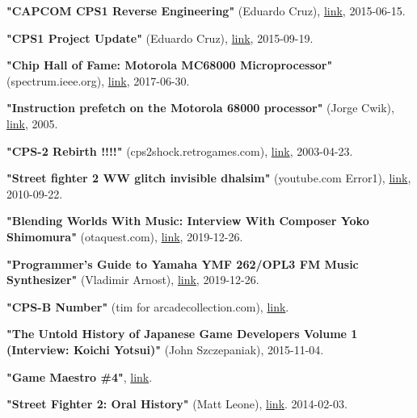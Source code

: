 \begin{thebibliography}{999}
  \textbf{"CAPCOM CPS1 Reverse Engineering"} (Eduardo Cruz),
  \href{https://www.youtube.com/watch?v=IBZc__9sM28}{link},
  2015-06-15.

  \textbf{"CPS1 Project Update"} (Eduardo Cruz),
  \href{http://arcadehacker.blogspot.com/2015/09/project-update.html}{link},
  2015-09-19.

  \textbf{"Chip Hall of Fame: Motorola MC68000 Microprocessor"} (spectrum.ieee.org),
  \href{https://spectrum.ieee.org/tech-history/silicon-revolution/chip-hall-of-fame-motorola-mc68000-microprocessor}{link},
  2017-06-30.

  \textbf{"Instruction prefetch on the Motorola 68000 processor"} (Jorge Cwik),
  \href{http://pasti.fxatari.com/68kdocs/68kPrefetch.html}{link},
  2005.
  

  \textbf{"CPS-2 Rebirth !!!!"} (cps2shock.retrogames.com),
  \href{https://web.archive.org/web/20060812042251/http://cps2shock.retrogames.com/wip.html}{link},
  2003-04-23.

  \textbf{"Street fighter 2 WW glitch invisible dhalsim"} (youtube.com Error1),
  \href{https://www.youtube.com/watch?v=qEFPzcOK_uQ}{link},
  2010-09-22.

  \textbf{"Blending Worlds With Music: Interview With Composer Yoko Shimomura"} (otaquest.com),
  \href{https://www.otaquest.com/yoko-shimomura-interview/}{link},
  2019-12-26.

  \textbf{"Programmer's Guide to Yamaha YMF 262/OPL3 FM Music Synthesizer"} (Vladimir Arnost),
  \href{https://www.fit.vutbr.cz/~arnost/opl/opl3.html}{link},
  2019-12-26.

  \textbf{"CPS-B Number"} (tim for arcadecollection.com),
  \href{http://www.arcadecollecting.com/info/cps-b_numbers.html}{link}.

  
  \textbf{"The Untold History of Japanese Game Developers Volume 1 (Interview: Koichi Yotsui)"} (John Szczepaniak),
  2015-11-04.

  \textbf{"Game Maestro \#4"}, \href{http://shmuplations.com/akiman/}{link}.

  \textbf{"Street Fighter 2: Oral History"} (Matt Leone),
  \href{https://www.polygon.com/a/street-fighter-2-oral-history/}{link}.
  2014-02-03.


\end{thebibliography}
